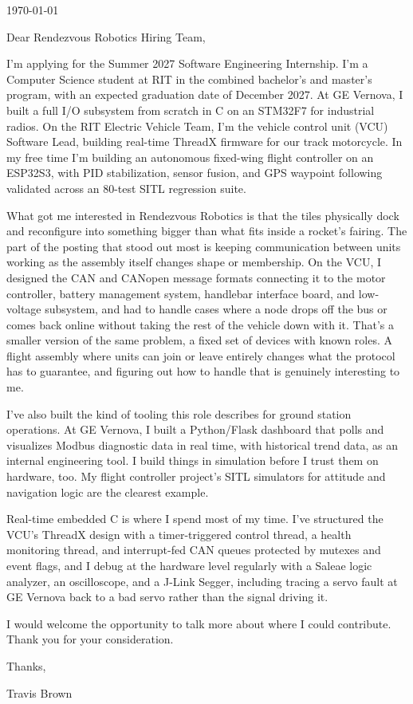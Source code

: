\documentclass[11pt]{article}
\begin{document}
\begin{flushright}
  \today
\end{flushright}

Dear Rendezvous Robotics Hiring Team,

I'm applying for the Summer 2027 Software Engineering Internship. I'm a
Computer Science student at RIT in the combined bachelor's and master's
program, with an expected graduation date of December 2027. At GE Vernova,
I built a full I/O subsystem from scratch in C on an STM32F7 for
industrial radios. On the RIT Electric Vehicle Team, I'm the vehicle
control unit (VCU) Software Lead, building real-time ThreadX firmware for
our track motorcycle. In my free time I'm building an autonomous
fixed-wing flight controller on an ESP32S3, with PID stabilization, sensor
fusion, and GPS waypoint following validated across an 80-test SITL
regression suite.

What got me interested in Rendezvous Robotics is that the tiles physically
dock and reconfigure into something bigger than what fits inside a
rocket's fairing. The part of the posting that stood out most is keeping
communication between units working as the assembly itself changes shape
or membership. On the VCU, I designed the CAN and CANopen message formats
connecting it to the motor controller, battery management system,
handlebar interface board, and low-voltage subsystem, and had to handle
cases where a node drops off the bus or comes back online without taking
the rest of the vehicle down with it. That's a smaller version of the same
problem, a fixed set of devices with known roles. A flight assembly where
units can join or leave entirely changes what the protocol has to
guarantee, and figuring out how to handle that is genuinely interesting to
me.

I've also built the kind of tooling this role describes for ground
station operations. At GE Vernova, I built a Python/Flask dashboard that
polls and visualizes Modbus diagnostic data in real time, with historical
trend data, as an internal engineering tool. I
build things in simulation before I trust them on hardware, too. My
flight controller project's SITL simulators for attitude and navigation
logic are the clearest example.

Real-time embedded C is where I spend most of my time. I've structured the
VCU's ThreadX design with a timer-triggered control thread, a health
monitoring thread, and interrupt-fed CAN queues protected by mutexes and
event flags, and I debug at the hardware level regularly with a Saleae
logic analyzer, an oscilloscope, and a J-Link Segger, including tracing a
servo fault at GE Vernova back to a bad servo rather than the signal
driving it.

I would welcome the opportunity to talk more about where I could
contribute. Thank you for your consideration.

Thanks,

Travis Brown
\end{document}

